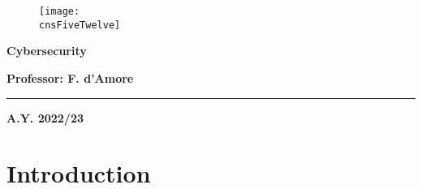 

	
	\begin{center}
		\begin{figure}[h]
			\centering
			\texttt{[image: \\cnsFiveTwelve]}
		\end{figure}
		\vspace{1cm} 
		{\fontsize{28}{34}\selectfont \textbf{Cybersecurity}}
	\end{center}

	\vspace{1cm} 
	
	\begin{center}
	{\fontsize{22}{28}\selectfont \textbf{Professor: F. d'Amore}}
	\end{center}

	\vspace{1cm} 

	\textcolor{blue!60!black}{\rule{\linewidth}{2pt}}
	
	\vspace{10cm} 
	
	\begin{center}
	\textbf{A.Y. 2022/23}
	\end{center}

	\thispagestyle{empty}
	
	\newpage
	
	\myTOC

	\newpage
	\section{Introduction}
	
	\newpage
